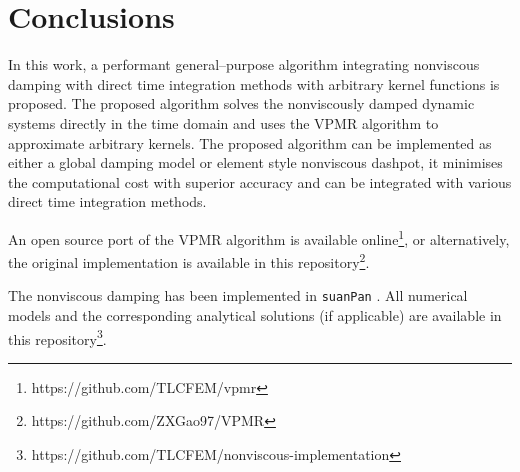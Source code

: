 \section{Conclusions}
In this work, a performant general--purpose algorithm integrating nonviscous damping with direct time integration methods with arbitrary kernel functions is proposed.
The proposed algorithm solves the nonviscously damped dynamic systems directly in the time domain and uses the VPMR algorithm to approximate arbitrary kernels.
The proposed algorithm can be implemented as either a global damping model or element style nonviscous dashpot, it minimises the computational cost with superior accuracy and can be integrated with various direct time integration methods.

An open source port of the VPMR algorithm is available online\footnote{https://github.com/TLCFEM/vpmr}, or alternatively, the original implementation is available in this repository\footnote{https://github.com/ZXGao97/VPMR}.

The nonviscous damping has been implemented in \texttt{suanPan} \citep{Chang2023}. All numerical models and the corresponding analytical solutions (if applicable) are available in this repository\footnote{https://github.com/TLCFEM/nonviscous-implementation}.